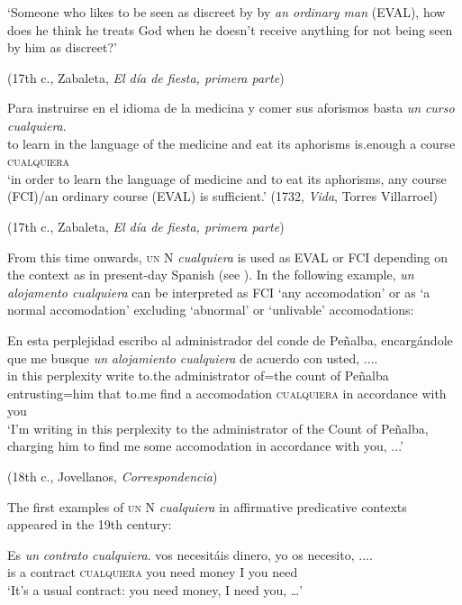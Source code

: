     \glt ‘Someone who likes to be seen as discreet by by \textit{an ordinary man} (EVAL), how does he think he treats God when he doesn’t receive anything for not being seen by him as discreet?’

    (17th c., Zabaleta, \textit{El día de fiesta, primera parte})
    
\ex \label{ex:key:297-3} 
\gll Para instruirse en el idioma de la medicina y comer sus aforismos basta \textit{un} \textit{curso} \textit{cualquiera}.\\
to learn in the language of the medicine and eat its aphorisms is.enough a course \textsc{cualquiera}\\
    \glt ‘in order to learn the language of medicine and to eat its aphorisms, any course (FCI)/an ordinary course (EVAL) is sufficient.’ (1732, \textit{Vida}, Torres Villarroel)

    (17th c., Zabaleta, \textit{El día de fiesta, primera parte})
\z
\z 

From this time onwards, \textsc{un} N \textit{cualquiera} is used as EVAL or FCI depending on the context as in present-day Spanish (see ). In the following example, \textit{un alojamento cualquiera} can be interpreted as FCI ‘any accomodation’ or as ‘a normal accomodation’ excluding ‘abnormal’ or ‘unlivable’ accomodations:

\ea \label{ex:key:298} %
    \gll En esta perplejidad escribo al administrador del conde de Peñalba, encargándole que me busque \textit{un} \textit{alojamiento} \textit{cualquiera} de acuerdo con usted, ....\\
in this perplexity write to.the administrator of=the count of Peñalba entrusting=him that to.me find a accomodation \textsc{cualquiera} in accordance with you\\
    \glt ‘I’m writing in this perplexity to the administrator of the Count of Peñalba, charging him to find me some accomodation in accordance with you, ...’

    (18th c., Jovellanos, \textit{Correspondencia})
\z

The first examples of \textsc{un} N \textit{cualquiera} in affirmative predicative contexts appeared in the 19th century:

\ea \label{ex:key:299} %
    \gll Es \textit{un} \textit{contrato} \textit{cualquiera}. vos necesitáis dinero, yo os necesito, ....\\
is a contract \textsc{cualquiera} you need money I you need\\
    \glt ‘It’s a usual contract: you need money, I need you, …’

